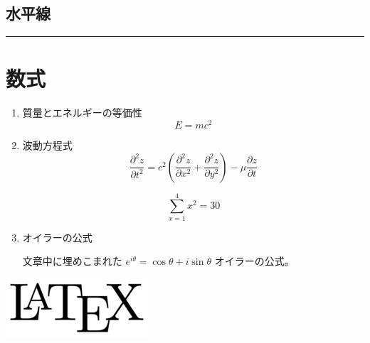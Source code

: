 \documentclass[a4paper,onecolumn,12pt]{jsarticle}
\begin{document}
\subsection{水平線}
\begin{center}\rule{3in}{0.4pt}\end{center}

\clearpage
\section{数式}
\begin{enumerate}

\item 質量とエネルギーの等価性
\begin{equation}
E = mc ^2
\end{equation}

\item 波動方程式
\begin{equation}
\frac{\partial^2 z}{\partial t^2}=
c^2 (\frac{\partial^2 z}{\partial x^2}+\frac{\partial^2 z}{\partial y^2})-
\mu \frac{\partial z}{\partial t}
\end{equation}

\begin{equation}
\sum_{x=1}^4 x^2 = 30
\end{equation}

\item オイラーの公式

文章中に埋めこまれた $e^{i\theta}=\cos\theta+i\sin\theta$ オイラーの公式。

\end{enumerate}

\includegraphics{latex.png}
\end{document}
